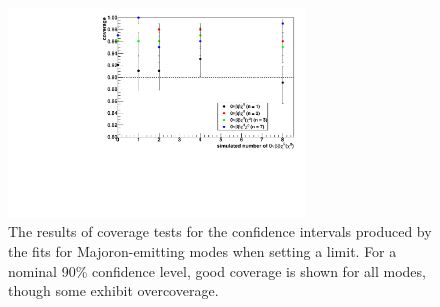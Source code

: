 \documentclass[herrin-thesis.tex]{subfiles}
\begin{document}
\begin{figure}[htb]
\centering
\includegraphics[width=0.7\textwidth]{./plots/analysis_bb0nX_coverage.pdf}
\caption[Coverage tests for \(0\nu\beta\beta\chi^0(\chi^0)\)]{The results of coverage tests for the confidence intervals produced by the fits for Majoron-emitting modes when setting a limit. For a nominal 90\% confidence level, good coverage is shown for all modes, though some exhibit overcoverage.}
\label{fig:analysis_bb0nX_coverage}
\end{figure}
\end{document}
